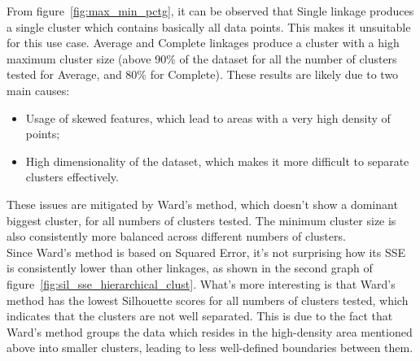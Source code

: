 From figure~\ref{fig:max_min_pctg}, it can be observed that Single linkage produces a single cluster which contains basically all data points. This makes it unsuitable for this use case.
Average and Complete linkages produce a cluster with a high maximum cluster size (above 90\% of the dataset for all the number of clusters tested for Average, and 80\% for Complete).
These results are likely due to two main causes: 
\begin{itemize}
    \item Usage of skewed features, which lead to areas with a very high density of points;
    \item High dimensionality of the dataset, which makes it more difficult to separate clusters effectively.
\end{itemize}

These issues are mitigated by Ward's method, which doesn't show a dominant biggest cluster, for
all numbers of clusters tested. The minimum cluster size is also consistently more balanced
across different numbers of clusters.\\

Since Ward's method is based on Squared Error, it's not surprising how its SSE is consistently lower than other linkages, as shown in the second graph of figure~\ref{fig:sil_sse_hierarchical_clust}.
What's more interesting is that Ward's method has the lowest Silhouette scores for all numbers
of clusters tested, which indicates that the clusters are not well separated. This is due to
the fact that Ward's method groups the data which resides in the high-density area
mentioned above into smaller clusters, leading to less well-defined boundaries between them.\\

